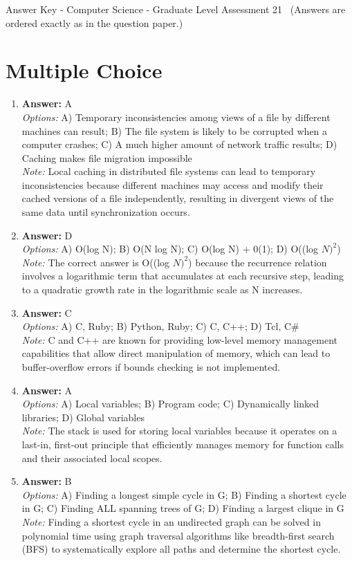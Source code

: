 \documentclass[12pt]{article}
\begin{document}
\begin{center}
Answer Key - Computer Science - Graduate Level Assessment 21 \
\small (Answers are ordered exactly as in the question paper.)
\end{center}

\section*{Multiple Choice}
\begin{enumerate}[label=\arabic*.]
\item \textbf{Answer:} A
\\ \textit{Options:} A) Temporary inconsistencies among views of a file by different machines can result; B) The file system is likely to be corrupted when a computer crashes; C) A much higher amount of network traffic results; D) Caching makes file migration impossible
\\ \textit{Note:} Local caching in distributed file systems can lead to temporary inconsistencies because different machines may access and modify their cached versions of a file independently, resulting in divergent views of the same data until synchronization occurs.
\item \textbf{Answer:} D
\\ \textit{Options:} A) O(log N); B) O(N log N); C) O(log N) + 0(1); D) O((log $N)^2$)
\\ \textit{Note:} The correct answer is O((log $N)^2$) because the recurrence relation involves a logarithmic term that accumulates at each recursive step, leading to a quadratic growth rate in the logarithmic scale as N increases.
\item \textbf{Answer:} C
\\ \textit{Options:} A) C, Ruby; B) Python, Ruby; C) C, C++; D) Tcl, C\#
\\ \textit{Note:} C and C++ are known for providing low-level memory management capabilities that allow direct manipulation of memory, which can lead to buffer-overflow errors if bounds checking is not implemented.
\item \textbf{Answer:} A
\\ \textit{Options:} A) Local variables; B) Program code; C) Dynamically linked libraries; D) Global variables
\\ \textit{Note:} The stack is used for storing local variables because it operates on a last-in, first-out principle that efficiently manages memory for function calls and their associated local scopes.
\item \textbf{Answer:} B
\\ \textit{Options:} A) Finding a longest simple cycle in G; B) Finding a shortest cycle in G; C) Finding ALL spanning trees of G; D) Finding a largest clique in G
\\ \textit{Note:} Finding a shortest cycle in an undirected graph can be solved in polynomial time using graph traversal algorithms like breadth-first search (BFS) to systematically explore all paths and determine the shortest cycle.
\end{enumerate}
\end{document}
